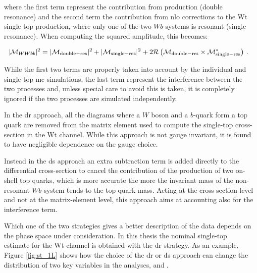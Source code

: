\noindent where the first term represent the contribution from \ttbar production (double resonance) and the second term the contribution from 
\gls{nlo} corrections to the Wt single-top production, where only one of the two $Wb$ systems is resonant (single resonance). 
When computing the squared amplitude, this becomes:

\begin{equation}
|\mathcal{M}_{WWbb}|^2 = |\mathcal{M}_{\rm{double-res}}|^2 + |\mathcal{M}_{\rm{single-res}}|^2 + 2 \mathcal{R}\left(\mathcal{M}_{\rm{double-res}}\times \mathcal{M}_{\rm{single-res}}^* \right) \; . \nonumber
\end{equation}

While the first two terms are properly taken into account by the individual \ttbar and single-top \gls{mc} simulations, 
the last term represent the interference between the two processes and, unless special care to avoid this is taken, it is completely ignored if the two processes are simulated independently. 

In the \gls{dr} approach, all the diagrams where a $W$ boson and a $b$-quark form a top quark are removed from the matrix element used to compute the   single-top cross-section in the Wt channel. While this approach is not gauge invariant, it is found to have negligible dependence on the gauge choice.

Instead in the \gls{ds} approach an extra subtraction term is added directly to the differential cross-section to cancel the contribution of the 
production of two on-shell top quarks, which is more accurate the more the invariant mass of the non-resonant $Wb$ system tends to the top quark mass. 
Acting at the cross-section level and not at the matrix-element level, this approach aims at accounting also for the interference term. 

Which one of the two strategies gives a better description of the data depends on the phase space under consideration. 
In this thesis the nominal single-top estimate for the Wt channel is obtained with the \gls{dr} strategy. 
As an example, Figure \ref{fig:st_1L} shows how the choice of the \gls{dr} or \gls{ds} approach can change the distribution of two key variables 
in the analyses, \met and \mtb. 

